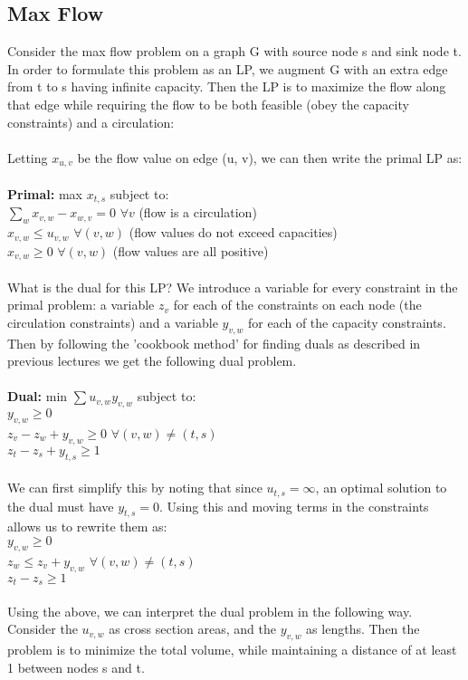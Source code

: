 \documentclass{article}
\begin{document}
\subsection{Max Flow}
Consider the max flow problem on a graph G with source node s and sink node t.  In order to formulate this problem as an LP, we augment G with an extra edge from t to s having infinite capacity.  Then the LP is to maximize the flow along that edge while requiring the flow to be both feasible (obey the capacity constraints) and a circulation:\\
\\
Letting $x_{u,v}$ be the flow value on edge (u, v), we can then write the primal LP as:\\
\\
\textbf{Primal:}  max $x_{t,s}$ subject to:\\
 $\sum_{w}x_{v,w} - x_{w,v} = 0$ $\forall v$ (flow is a circulation)\\
 $x_{v,w} \leq u_{v,w}$ $\forall (v,w)$ (flow values do not exceed capacities)\\
 $x_{v,w} \geq 0$  $\forall (v,w)$ (flow values are all positive)\\
\\
What is the dual for this LP?  We introduce a variable for every constraint in the primal problem: a variable $z_v$ for each of the constraints on each node (the circulation constraints) and a variable $y_{v,w}$ for each of the capacity constraints.  Then by following the 'cookbook method' for finding duals as described in previous lectures we get the following dual problem.\\
\\
\textbf{Dual:} min $\sum u_{v,w}y_{v,w}$ subject to:\\
$y_{v,w} \geq 0$\\
$z_v - z_w + y_{v,w} \geq 0$ $\forall (v,w) \neq (t,s)$\\
$z_t - z_s + y_{t,s} \geq 1$\\
\\
We can first simplify this by noting that since $u_{t,s} = \infty$, an optimal solution to the dual must have $y_{t,s} = 0$.  Using this and moving terms in the constraints allows us to rewrite them as:\\
$y_{v,w} \geq 0$\\
$z_w \leq  z_v +  y_{v,w}$ $\forall (v,w) \neq (t,s)$\\
$z_t - z_s \geq 1$\\
\\
Using the above, we can interpret the dual problem in the following way.  Consider the $u_{v,w}$ as cross section areas, and the $y_{v,w}$ as lengths.  Then the problem is to minimize the total volume, while maintaining a distance of at least 1 between nodes s and t.\\
\end{document}
